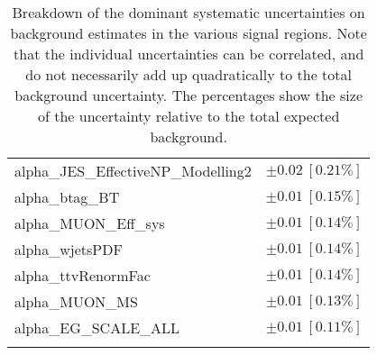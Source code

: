 \begin{table}
\begin{center}
\begin{tabular*}{\textwidth}{@{\extracolsep{\fill}}lc}
alpha\_JES\_EffectiveNP\_Modelling2         & $\pm 0.02\ [0.21\%] $       \\
alpha\_btag\_BT         & $\pm 0.01\ [0.15\%] $       \\
alpha\_MUON\_Eff\_sys         & $\pm 0.01\ [0.14\%] $       \\
alpha\_wjetsPDF         & $\pm 0.01\ [0.14\%] $       \\
alpha\_ttvRenormFac         & $\pm 0.01\ [0.14\%] $       \\
alpha\_MUON\_MS         & $\pm 0.01\ [0.13\%] $       \\
alpha\_EG\_SCALE\_ALL         & $\pm 0.01\ [0.11\%] $       \\
\noalign{\smallskip}\hline\noalign{\smallskip}
\end{tabular*}
\end{center}
\caption[Breakdown of uncertainty on background estimates]{
Breakdown of the dominant systematic uncertainties on background estimates in the various signal regions.
Note that the individual uncertainties can be correlated, and do not necessarily add up quadratically to 
the total background uncertainty. The percentages show the size of the uncertainty relative to the total expected background.
\label{table.results.bkgestimate.uncertainties.VRtt2offEM_cuts}}
\end{table}
%